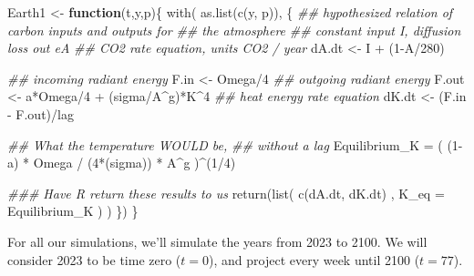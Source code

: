 \documentclass[
  letterpaper,
  DIV=11,
  numbers=noendperiod]{scrreprt}
\newenvironment{Shaded}{\begin{snugshade}}{\end{snugshade}}
\newcommand{\AttributeTok}[1]{\textcolor[rgb]{0.40,0.45,0.13}{#1}}
\newcommand{\ControlFlowTok}[1]{\textcolor[rgb]{0.00,0.23,0.31}{\textbf{#1}}}
\newcommand{\DecValTok}[1]{\textcolor[rgb]{0.68,0.00,0.00}{#1}}
\newcommand{\DocumentationTok}[1]{\textcolor[rgb]{0.37,0.37,0.37}{\textit{#1}}}
\newcommand{\FunctionTok}[1]{\textcolor[rgb]{0.28,0.35,0.67}{#1}}
\newcommand{\NormalTok}[1]{\textcolor[rgb]{0.00,0.23,0.31}{#1}}
\newcommand{\OtherTok}[1]{\textcolor[rgb]{0.00,0.23,0.31}{#1}}
\newcommand{\SpecialCharTok}[1]{\textcolor[rgb]{0.37,0.37,0.37}{#1}}
\begin{document}
\begin{Shaded}
\begin{Highlighting}[]
\NormalTok{Earth1 }\OtherTok{\textless{}{-}} \ControlFlowTok{function}\NormalTok{(t,y,p)\{}
  \FunctionTok{with}\NormalTok{( }\FunctionTok{as.list}\NormalTok{(}\FunctionTok{c}\NormalTok{(y, p)), \{}
    \DocumentationTok{\#\# hypothesized relation of carbon inputs and outputs for }
    \DocumentationTok{\#\# the atmosphere}
    \DocumentationTok{\#\# constant input I, diffusion loss out eA}
    \DocumentationTok{\#\# CO2 rate equation, units CO2 / year}
\NormalTok{    dA.dt }\OtherTok{\textless{}{-}}\NormalTok{ I }\SpecialCharTok{+}\NormalTok{ (}\DecValTok{1}\SpecialCharTok{{-}}\NormalTok{A}\SpecialCharTok{/}\DecValTok{280}\NormalTok{)}
    
    \DocumentationTok{\#\# incoming radiant energy}
\NormalTok{    F.in }\OtherTok{\textless{}{-}}\NormalTok{ Omega}\SpecialCharTok{/}\DecValTok{4} 
    \DocumentationTok{\#\# outgoing radiant energy}
\NormalTok{    F.out }\OtherTok{\textless{}{-}}\NormalTok{ a}\SpecialCharTok{*}\NormalTok{Omega}\SpecialCharTok{/}\DecValTok{4} \SpecialCharTok{+}\NormalTok{ (sigma}\SpecialCharTok{/}\NormalTok{A}\SpecialCharTok{\^{}}\NormalTok{g)}\SpecialCharTok{*}\NormalTok{K}\SpecialCharTok{\^{}}\DecValTok{4}
    \DocumentationTok{\#\# heat energy rate equation}
\NormalTok{    dK.dt }\OtherTok{\textless{}{-}}\NormalTok{ (F.in }\SpecialCharTok{{-}}\NormalTok{ F.out)}\SpecialCharTok{/}\NormalTok{lag}
    
    \DocumentationTok{\#\# What the temperature WOULD be, }
    \DocumentationTok{\#\# without a lag }
\NormalTok{    Equilibrium\_K }\OtherTok{=}\NormalTok{ ( (}\DecValTok{1}\SpecialCharTok{{-}}\NormalTok{a) }\SpecialCharTok{*}\NormalTok{ Omega }\SpecialCharTok{/}\NormalTok{ (}\DecValTok{4}\SpecialCharTok{*}\NormalTok{(sigma)) }\SpecialCharTok{*}\NormalTok{ A}\SpecialCharTok{\^{}}\NormalTok{g )}\SpecialCharTok{\^{}}\NormalTok{(}\DecValTok{1}\SpecialCharTok{/}\DecValTok{4}\NormalTok{)}
    
    \DocumentationTok{\#\#\# Have R return these results to us}
    \FunctionTok{return}\NormalTok{(}\FunctionTok{list}\NormalTok{( }\FunctionTok{c}\NormalTok{(dA.dt, dK.dt) , }
                 \AttributeTok{K\_eq =}\NormalTok{ Equilibrium\_K}
\NormalTok{    ) )}
\NormalTok{  \})}
\NormalTok{\}}
\end{Highlighting}
\end{Shaded}

For all our simulations, we'll simulate the years from 2023 to 2100. We
will consider 2023 to be time zero (\(t=0\)), and project every week
until 2100 (\(t=77\)).
\end{document}
